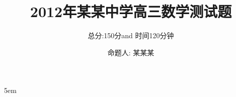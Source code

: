 \documentclass[12pt]{article}
\begin{document}
\title{2012年某某中学高三数学测试题}
\author{总分:150分and 时间120分钟}
\date{命题人: 某某某}
\maketitle

\setlength{\parskip} {5em}
\setlength\parindent{2em}

\vspace{1em}

\vspace{2em}

\vspace{2em}
\end{document}
